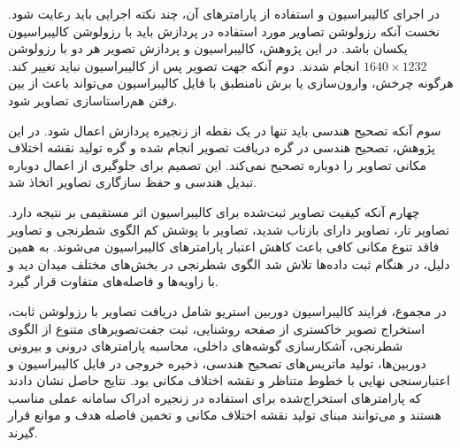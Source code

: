 در اجرای کالیبراسیون و استفاده از پارامترهای آن، چند نکته اجرایی باید رعایت شود. نخست آنکه رزولوشن تصاویر مورد استفاده در پردازش باید با رزولوشن کالیبراسیون یکسان باشد. در این پژوهش، کالیبراسیون و پردازش تصویر هر دو با رزولوشن $1640 \times 1232$ انجام شدند. دوم آنکه جهت تصویر پس از کالیبراسیون نباید تغییر کند. هرگونه چرخش، وارون‌سازی یا برش نامنطبق با فایل کالیبراسیون می‌تواند باعث از بین رفتن هم‌راستاسازی تصاویر شود.

سوم آنکه تصحیح هندسی باید تنها در یک نقطه از زنجیره پردازش اعمال شود. در این پژوهش، تصحیح هندسی در گره دریافت تصویر انجام شده و گره تولید نقشه اختلاف مکانی تصاویر را دوباره تصحیح نمی‌کند. این تصمیم برای جلوگیری از اعمال دوباره تبدیل هندسی و حفظ سازگاری تصاویر اتخاذ شد.

چهارم آنکه کیفیت تصاویر ثبت‌شده برای کالیبراسیون اثر مستقیمی بر نتیجه دارد. تصاویر تار، تصاویر دارای بازتاب شدید، تصاویر با پوشش کم الگوی شطرنجی و تصاویر فاقد تنوع مکانی کافی باعث کاهش اعتبار پارامترهای کالیبراسیون می‌شوند. به همین دلیل، در هنگام ثبت داده‌ها تلاش شد الگوی شطرنجی در بخش‌های مختلف میدان دید و با زاویه‌ها و فاصله‌های متفاوت قرار گیرد.

در مجموع، فرایند کالیبراسیون دوربین استریو شامل دریافت تصاویر با رزولوشن ثابت، استخراج تصویر خاکستری از صفحه روشنایی، ثبت جفت‌تصویرهای متنوع از الگوی شطرنجی، آشکارسازی گوشه‌های داخلی، محاسبه پارامترهای درونی و بیرونی دوربین‌ها، تولید ماتریس‌های تصحیح هندسی، ذخیره خروجی در فایل کالیبراسیون و اعتبارسنجی نهایی با خطوط متناظر و نقشه اختلاف مکانی بود. نتایج حاصل نشان دادند که پارامترهای استخراج‌شده برای استفاده در زنجیره ادراک سامانه عملی مناسب هستند و می‌توانند مبنای تولید نقشه اختلاف مکانی و تخمین فاصله هدف و موانع قرار گیرند.